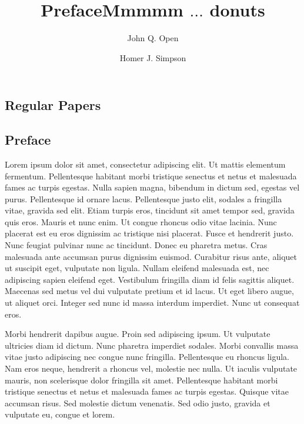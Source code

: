 \documentclass[a4paper,UKenglish]{lipicsmaster-v2018}
\begin{document}
\begin{contentslist}

\contitem
\title{Preface}
\author{John Q. Open}

\part{Regular Papers}

\contitem
\title{Mmmmm $\ldots$ donuts}
\author{Homer J. Simpson}


\end{contentslist}



\chapter{Preface} %

Lorem ipsum dolor sit amet, consectetur adipiscing elit. Ut mattis
elementum fermentum. Pellentesque habitant morbi tristique senectus et
netus et malesuada fames ac turpis egestas. Nulla sapien magna,
bibendum in dictum sed, egestas vel purus. Pellentesque id ornare
lacus. Pellentesque justo elit, sodales a fringilla vitae, gravida sed
elit. Etiam turpis eros, tincidunt sit amet tempor sed, gravida quis
eros. Mauris et nunc enim. Ut congue rhoncus odio vitae lacinia. Nunc
placerat est eu eros dignissim ac tristique nisi placerat. Fusce et
hendrerit justo. Nunc feugiat pulvinar nunc ac tincidunt. Donec eu
pharetra metus. Cras malesuada ante accumsan purus dignissim
euismod. Curabitur risus ante, aliquet ut suscipit eget, vulputate non
ligula. Nullam eleifend malesuada est, nec adipiscing sapien eleifend
eget. Vestibulum fringilla diam id felis sagittis aliquet. Maecenas
sed metus vel dui vulputate pretium et id lacus. Ut eget libero augue,
ut aliquet orci. Integer sed nunc id massa interdum imperdiet. Nunc ut
consequat eros.

Morbi hendrerit dapibus augue. Proin sed adipiscing ipsum. Ut
vulputate ultricies diam id dictum. Nunc pharetra imperdiet
sodales. Morbi convallis massa vitae justo adipiscing nec congue nunc
fringilla. Pellentesque eu rhoncus ligula. Nam eros neque, hendrerit a
rhoncus vel, molestie nec nulla. Ut iaculis vulputate mauris, non
scelerisque dolor fringilla sit amet. Pellentesque habitant morbi
tristique senectus et netus et malesuada fames ac turpis
egestas. Quisque vitae accumsan risus. Sed molestie dictum
venenatis. Sed odio justo, gravida et vulputate eu, congue et lorem. 
\end{document}
